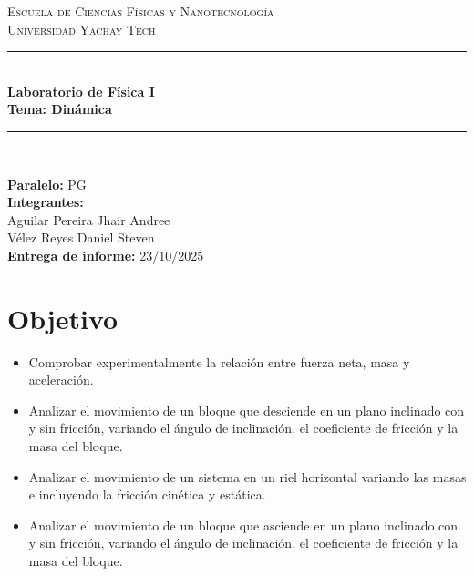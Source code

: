 \documentclass[11pt,a4paper]{article}
\begin{document}
\begin{center}
    \textsc{\Large Escuela de Ciencias Físicas y Nanotecnología} \\[0.2cm]
    \textsc{\large Universidad Yachay Tech} \\[0.6cm]
    \noindent\rule{\textwidth}{1pt} \\[0.4cm]
    {\Large \bfseries Laboratorio de Física I} \\[0.3cm]
    {\LARGE \bfseries Tema: Dinámica} \\[0.4cm]
    \noindent\rule{\textwidth}{1pt} \\[0.6cm]
\end{center}

\begin{flushleft}
    \textbf{Paralelo:} PG \\
    \textbf{Integrantes:} \\
    \hspace{0.5cm} Aguilar Pereira Jhair Andree \\
    \hspace{0.5cm} Vélez Reyes Daniel Steven \\
    \textbf{Entrega de informe:} 23/10/2025
\end{flushleft}
\vspace{0.5cm}

\section{Objetivo}
\begin{itemize}
    \item Comprobar experimentalmente la relación entre fuerza neta, masa y aceleración.
    \item Analizar el movimiento de un bloque que desciende en un plano inclinado con y sin fricción, variando el ángulo de inclinación, el coeficiente de fricción y la masa del bloque.
    \item Analizar el movimiento de un sistema en un riel horizontal variando las masas e incluyendo la fricción cinética y estática.
    \item Analizar el movimiento de un bloque que asciende en un plano inclinado con y sin fricción, variando el ángulo de inclinación, el coeficiente de fricción y la masa del bloque.
\end{itemize}
\end{document}

